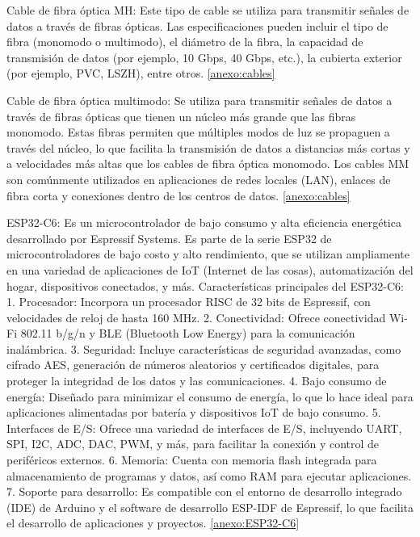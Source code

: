     Cable de fibra óptica MH: Este tipo de cable se utiliza para transmitir señales de datos a través de fibras ópticas. Las especificaciones pueden incluir el tipo de fibra (monomodo o multimodo), el diámetro de la fibra, la capacidad de transmisión de datos (por ejemplo, 10 Gbps, 40 Gbps, etc.), la cubierta exterior (por ejemplo, PVC, LSZH), entre otros.
    \ref{anexo:cables}
    
     Cable de fibra óptica multimodo: Se utiliza para transmitir señales de datos a través de fibras ópticas que tienen un núcleo más grande que las fibras monomodo. Estas fibras permiten que múltiples modos de luz se propaguen a través del núcleo, lo que facilita la transmisión de datos a distancias más cortas y a velocidades más altas que los cables de fibra óptica monomodo. Los cables MM son comúnmente utilizados en aplicaciones de redes locales (LAN), enlaces de fibra corta y conexiones dentro de los centros de datos.
    \ref{anexo:cables}
    
    ESP32-C6: Es un microcontrolador de bajo consumo y alta eficiencia energética desarrollado por Espressif Systems. Es parte de la serie ESP32 de microcontroladores de bajo costo y alto rendimiento, que se utilizan ampliamente en una variedad de aplicaciones de IoT (Internet de las cosas), automatización del hogar, dispositivos conectados, y más.
    Características principales del ESP32-C6:
    1.	Procesador: Incorpora un procesador RISC de 32 bits de Espressif, con velocidades de reloj de hasta 160 MHz.
    2.	Conectividad: Ofrece conectividad Wi-Fi 802.11 b/g/n y BLE (Bluetooth Low Energy) para la comunicación inalámbrica.
    3.	Seguridad: Incluye características de seguridad avanzadas, como cifrado AES, generación de números aleatorios y certificados digitales, para proteger la integridad de los datos y las comunicaciones.
    4.	Bajo consumo de energía: Diseñado para minimizar el consumo de energía, lo que lo hace ideal para aplicaciones alimentadas por batería y dispositivos IoT de bajo consumo.
    5.	Interfaces de E/S: Ofrece una variedad de interfaces de E/S, incluyendo UART, SPI, I2C, ADC, DAC, PWM, y más, para facilitar la conexión y control de periféricos externos.
    6.	Memoria: Cuenta con memoria flash integrada para almacenamiento de programas y datos, así como RAM para ejecutar aplicaciones.
    7.	Soporte para desarrollo: Es compatible con el entorno de desarrollo integrado (IDE) de Arduino y el software de desarrollo ESP-IDF de Espressif, lo que facilita el desarrollo de aplicaciones y proyectos.
    \ref{anexo:ESP32-C6}
    
